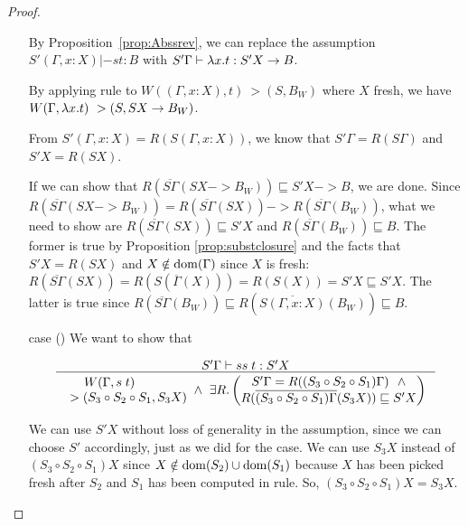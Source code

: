\begin{proof}
\begin{itemize}
	By Proposition~\ref{prop:Abssrev}, we can replace the assumption
	$S'(\Gamma,x:X) |-s t:B$ with
	$S'\Gamma |- \lambda x.t : S'X -> B$.

	By applying  rule to
	$W((\Gamma, x:X),t) ~> (S,B_W)$ where $X$ fresh,
	we have $W(\Gamma,\lambda x.t) ~> (S,S X -> B_W)$.

	From $S'(\Gamma,x:X)=R(S(\Gamma,x:X))$, we know that
	$S'\Gamma = R(S\Gamma)$ and $S'X = R(S X)$.

	If we can show that
	$R(\overline{S\Gamma}(S X -> B_W)) \sqsubseteq S'X -> B$,
	we are done. Since
	$R(\overline{S\Gamma}(S X -> B_W)) =
	R(\overline{S\Gamma}(S X)) -> R(\overline{S\Gamma}(B_W))$,
	what we need to show are
	$R(\overline{S\Gamma}(S X))\sqsubseteq S'X$ and
	$R(\overline{S\Gamma}(B_W)) \sqsubseteq B$.
	The former is true by Proposition \ref{prop:substclosure} and
	the facts that $S'X = R(S X)$ and
	$X\notin \mathop{\mathrm{dom}}(\Gamma)$ since $X$ is fresh:
	$R(\overline{S\Gamma}(S X)) =
	R(S(\overline{\Gamma}(X))) = R(S(X)) = S'X
	\sqsubseteq S' X$.
	The latter is true since $ R(\overline{S\Gamma}(B_W)) 
	\sqsubseteq R(\overline{S(\Gamma,x:X)}(B_W)) \sqsubseteq B$.

\item[case]()
	We want to show that \vspace*{-2em}
	\begin{singlespace}
	\[\inference{S'\Gamma |-s s\;t : S'X}{
	\begin{matrix} W(\Gamma,s\;t) ~\qquad~ \\ ~> (S_3\circ S_2\circ S_1,S_3 X)
	\end{matrix}
	~\land~
	\exists R.
		\left(\begin{matrix}
			S'\Gamma=R((S_3\circ S_2\circ S_1)\Gamma) ~~ \land \\
			R(\overline{(S_3\circ S_2\circ S_1)\Gamma}(S_3 X))
			\sqsubseteq S'X
		\end{matrix}\right) } \]
	\end{singlespace}
	We can use $S'X$ without loss of generality in the assumption,
	since we can choose $S'$ accordingly, just as we did for the
	 case.
	We can use $S_3 X$ instead of $(S_3\circ S_2\circ S_1) X$
	since $X\notin\mathop{\mathrm{dom}}(S_2)\cup\mathop{\mathrm{dom}}(S_1)$ because
	$X$ has been picked fresh after $S_2$ and $S_1$ has been computed
	in  rule.
	So, $(S_3\circ S_2\circ S_1) X = S_3 X$.


\end{itemize}
\end{proof}
